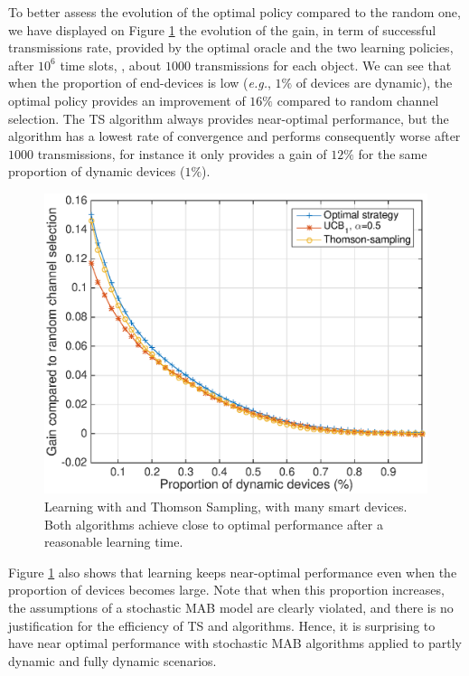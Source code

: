 To better assess the evolution of the optimal policy compared to the random one, we have displayed on Figure \ref{fig:41:perf_learning} the evolution of the gain, in term of successful transmissions rate, provided by the optimal oracle and the two learning policies, after $10^6$ time slots, \ie, about $1000$ transmissions for each object.
We can see that when the proportion of end-devices is low (\emph{e.g.}, $1\%$ of devices are dynamic), the optimal policy provides an improvement of $16\%$ compared to random channel selection.
The TS algorithm always provides near-optimal performance, but the \UCB{} algorithm has a lowest rate of convergence and performs consequently worse after $1000$ transmissions, for instance it only provides a gain of $12\%$ for the same proportion of dynamic devices ($1\%$).

\begin{figure}[!t]
    \centering
    \includegraphics[scale=0.60]{perf_learning.eps}
    \caption{Learning with \UCB{} and Thomson Sampling, with many smart devices. Both algorithms achieve close to optimal performance after a reasonable learning time.}
    \label{fig:41:perf_learning}
\end{figure}

Figure \ref{fig:41:perf_learning} also shows that learning keeps near-optimal performance even when the proportion of devices becomes large.
Note that when this proportion increases, the assumptions of a stochastic MAB model are clearly violated, and there is no justification for the efficiency of TS and \UCB{} algorithms.
Hence, it is surprising to have near optimal performance with stochastic MAB algorithms applied to partly dynamic and fully dynamic scenarios.


